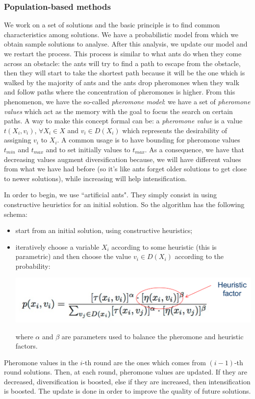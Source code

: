 \documentclass[10pt,a4paper]{article}
\begin{document}
\subsubsection{Population-based methods}
We work on a set of solutions and the basic principle is to find common
characteristics among solutions. We have a probabilistic model from which we
obtain sample solutions to analyse. After this analysis, we update our model and
we restart the process. This process is similar to what ants do when they come
across an obstacle: the ants will try to find a path to escape from the
obstacle, then they will start to take the shortest path because it will be the
one which is walked by the majority of ants and the ants drop pheromones when
they walk and follow paths where the concentration of pheromones is higher. From
this phenomenon, we have the so-called \textit{pheromone model}: we have a set
of \textit{pheromone values} which act as the memory with the goal to focus the
search on certain paths. A way to make this concept formal can be: a
\textit{pheromone value} is a value $t(X_i, v_i)$, $\forall X_i \in X$ and
$v_i \in D(X_i)$ which represents the desirability of assigning $v_i$ to $X_i$.
A common usage is to have bounding for pheromone values $t_{min}$ and $t_{max}$
and to set initially values to $t_{max}$. As a consequence, we have that
decreasing values augment diversification because, we will have different values
from what we have had before (so it's like ants forget older solutions to get
close to newer solutions), while increasing will help intensification.

In order to begin, we use ``artificial ants". They simply consist in using
constructive heuristics for an initial solution. So the algorithm has the
following schema:
\begin{itemize}
    \item start from an initial solution, using constructive heuristics;
    \item iteratively choose a variable $X_i$ according to some heuristic (this
    is parametric) and then choose the value $v_i \in D(X_i)$ according to the
    probability:

    \includegraphics[scale=0.2]{prob_ants.png}    

    where $\alpha$ and $\beta$ are parameters used to balance the pheromone and
    heuristic factors.
\end{itemize}
Pheromone values in the $i$-th round are the ones which comes from $(i-1)$-th
round solutions. Then, at each round, pheromone values are updated. If they are
decreased, diversification is boosted, else if they are increased, then
intensification is boosted. The update is done in order to improve the quality
of future solutions.
\end{document}
